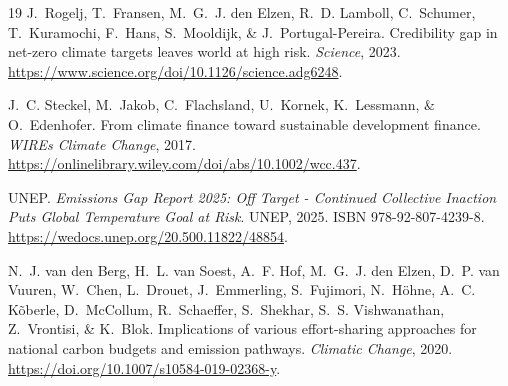 \documentclass[12pt,english]{article}
\begin{document}
\begin{thebibliography}{19}
J.~Rogelj, T.~Fransen, M.~G.~J. {den Elzen}, R.~D. Lamboll, C.~Schumer,
  T.~Kuramochi, F.~Hans, S.~Mooldijk, \& J.~{Portugal-Pereira}.
\newblock Credibility gap in net-zero climate targets leaves world at high
  risk.
\newblock \emph{Science}, 2023.
\newblock \url{https://www.science.org/doi/10.1126/science.adg6248}.

J.~C. Steckel, M.~Jakob, C.~Flachsland, U.~Kornek, K.~Lessmann, \&
  O.~Edenhofer.
\newblock From climate finance toward sustainable development finance.
\newblock \emph{WIREs Climate Change}, 2017.
\newblock \url{https://onlinelibrary.wiley.com/doi/abs/10.1002/wcc.437}.

{UNEP}.
\newblock \emph{Emissions {{Gap Report}} 2025: {{Off Target}} - {{Continued
  Collective}} Inaction Puts {{Global Temperature Goal}} at {{Risk}}}.
\newblock UNEP, 2025.
\newblock ISBN 978-92-807-4239-8.
\newblock \url{https://wedocs.unep.org/20.500.11822/48854}.

N.~J. {van den Berg}, H.~L. {van Soest}, A.~F. Hof, M.~G.~J. {den Elzen}, D.~P.
  {van Vuuren}, W.~Chen, L.~Drouet, J.~Emmerling, S.~Fujimori, N.~H{\"o}hne,
  A.~C. K{\~o}berle, D.~McCollum, R.~Schaeffer, S.~Shekhar, S.~S. Vishwanathan,
  Z.~Vrontisi, \& K.~Blok.
\newblock Implications of various effort-sharing approaches for national carbon
  budgets and emission pathways.
\newblock \emph{Climatic Change}, 2020.
\newblock \url{https://doi.org/10.1007/s10584-019-02368-y}.

\end{thebibliography}


\appendix

\renewcommand{\thetable}{A\arabic{table}}
\renewcommand{\thefigure}{A\arabic{figure}}
\setcounter{figure}{0}
\setcounter{table}{0}

\end{document}
